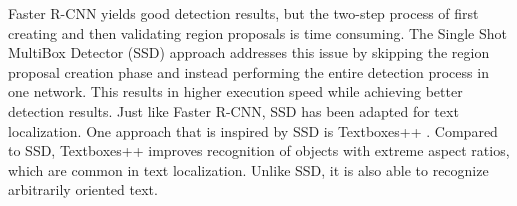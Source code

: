 Faster R-CNN yields good detection results, but the two-step process of first creating and then validating region proposals is time consuming. The 
Single Shot MultiBox Detector (SSD) approach \cite{liu2016ssd} addresses this issue by skipping the region proposal creation phase and instead
performing the entire detection process in one network. This results in higher execution speed while achieving better detection results. Just like 
Faster R-CNN, SSD has been adapted for text localization. One approach that is inspired by SSD is Textboxes++ \cite{liao2018textboxes++}. Compared to 
SSD, Textboxes++ improves recognition of objects with extreme aspect ratios, which are common in text localization. Unlike SSD, it is also able 
to recognize arbitrarily oriented text.
